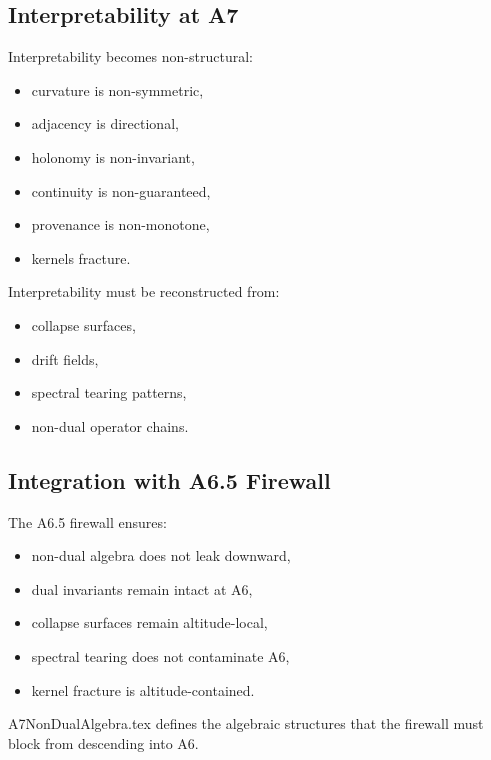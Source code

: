 \subsection{Interpretability at A7}

Interpretability becomes non-structural:
\begin{itemize}
  \item curvature is non-symmetric,
  \item adjacency is directional,
  \item holonomy is non-invariant,
  \item continuity is non-guaranteed,
  \item provenance is non-monotone,
  \item kernels fracture.
\end{itemize}

Interpretability must be reconstructed from:
\begin{itemize}
  \item collapse surfaces,
  \item drift fields,
  \item spectral tearing patterns,
  \item non-dual operator chains.
\end{itemize}

\subsection{Integration with A6.5 Firewall}

The A6.5 firewall ensures:
\begin{itemize}
  \item non-dual algebra does not leak downward,
  \item dual invariants remain intact at A6,
  \item collapse surfaces remain altitude-local,
  \item spectral tearing does not contaminate A6,
  \item kernel fracture is altitude-contained.
\end{itemize}

A7NonDualAlgebra.tex defines the algebraic structures that the firewall must
block from descending into A6.

